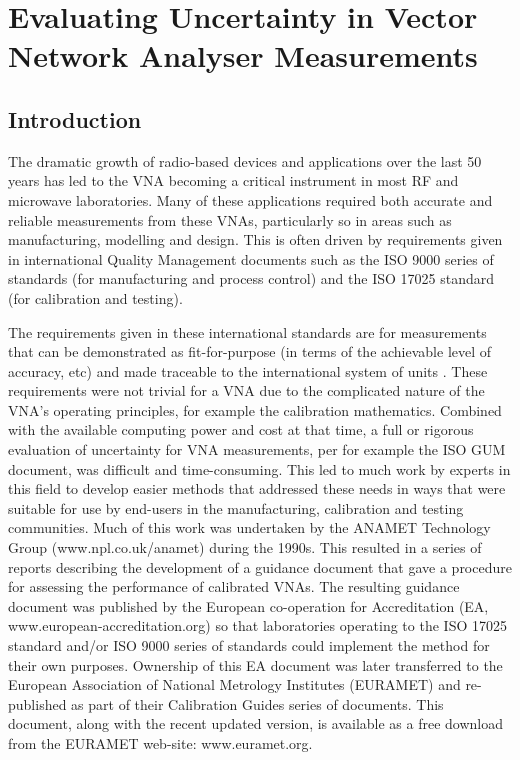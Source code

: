 \documentclass[../thesis/thesis.tex]{subfiles}
\begin{document}
	
\onlyinsubfile{\setcounter{chapter}{3}}

\chapter[Evaluating Uncertainty in VNA Measurements]{Evaluating Uncertainty in Vector \\Network Analyser Measurements}

\section{Introduction}

The dramatic growth of radio-based devices and applications over the last 50 years has led to the VNA becoming a critical instrument in most RF and microwave laboratories. Many of these applications required both accurate and reliable measurements from these VNAs, particularly so in areas such as manufacturing, modelling and design.  This is often driven by requirements given in international Quality Management documents such as the ISO 9000 series of standards \cite{ISO9000} (for manufacturing and process control) and the ISO 17025 standard \cite{ISO17025} (for calibration and testing).

The requirements given in these international standards are for measurements that can be demonstrated as fit-for-purpose (in terms of the achievable level of accuracy, etc) and made traceable to the international system of units \cite{SI_2019, SI_2019B}.  These requirements were not trivial for a VNA due to the complicated nature of the VNA’s operating principles, for example the calibration mathematics. Combined with the available computing power and cost at that time, a full or rigorous evaluation of uncertainty for VNA measurements, per for example the ISO GUM document, was difficult and time-consuming. This led to much work by experts in this field to develop easier methods that addressed these needs in ways that were suitable for use by end-users in the manufacturing, calibration and testing communities.  Much of this work was undertaken by the ANAMET Technology Group (www.npl.co.uk/anamet) during the 1990s.  This resulted in a series of reports \cite{ANAMET_1996, ANAMET_1998, ANAMET_1999} describing the development of a guidance document that gave a procedure for assessing the performance of calibrated VNAs.  The resulting guidance document \cite{EA_2000} was published by the European co-operation for Accreditation (EA, www.european-accreditation.org) so that laboratories operating to the ISO 17025 standard and/or ISO 9000 series of standards could implement the method for their own purposes.  Ownership of this EA document was later transferred to the European Association of National Metrology Institutes (EURAMET) and re-published \cite{EURAMET_2011} as part of their Calibration Guides series of documents. This document, along with the recent updated version, is available as a free download from the EURAMET web-site: www.euramet.org.
\end{document}

